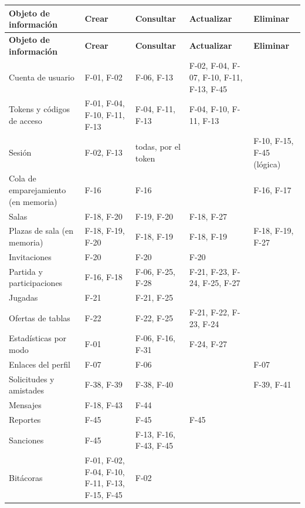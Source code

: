 \begin{center}\small
\begin{longtable}{|L{0.21\textwidth}|L{0.18\textwidth}|L{0.13\textwidth}|L{0.21\textwidth}|L{0.13\textwidth}|}
\hline
\textbf{Objeto de información} & \textbf{Crear} & \textbf{Consultar} & \textbf{Actualizar} & \textbf{Eliminar} \\ \hline
\endfirsthead
\hline
\textbf{Objeto de información} & \textbf{Crear} & \textbf{Consultar} & \textbf{Actualizar} & \textbf{Eliminar} \\ \hline
\endhead
Cuenta de usuario & \mbox{F-01}, \mbox{F-02} & \mbox{F-06}, \mbox{F-13} & \mbox{F-02}, \mbox{F-04}, \mbox{F-07}, \mbox{F-10}, \mbox{F-11}, \mbox{F-13}, \mbox{F-45} &  \\ \hline
Tokens y códigos de acceso & \mbox{F-01}, \mbox{F-04}, \mbox{F-10}, \mbox{F-11}, \mbox{F-13} & \mbox{F-04}, \mbox{F-11}, \mbox{F-13} & \mbox{F-04}, \mbox{F-10}, \mbox{F-11}, \mbox{F-13} &  \\ \hline
Sesión & \mbox{F-02}, \mbox{F-13} & todas, por el token &  & \mbox{F-10}, \mbox{F-15}, \mbox{F-45} (lógica) \\ \hline
Cola de emparejamiento (en memoria) & \mbox{F-16} & \mbox{F-16} &  & \mbox{F-16}, \mbox{F-17} \\ \hline
Salas & \mbox{F-18}, \mbox{F-20} & \mbox{F-19}, \mbox{F-20} & \mbox{F-18}, \mbox{F-27} &  \\ \hline
Plazas de sala (en memoria) & \mbox{F-18}, \mbox{F-19}, \mbox{F-20} & \mbox{F-18}, \mbox{F-19} & \mbox{F-18}, \mbox{F-19} & \mbox{F-18}, \mbox{F-19}, \mbox{F-27} \\ \hline
Invitaciones & \mbox{F-20} & \mbox{F-20} & \mbox{F-20} &  \\ \hline
Partida y participaciones & \mbox{F-16}, \mbox{F-18} & \mbox{F-06}, \mbox{F-25}, \mbox{F-28} & \mbox{F-21}, \mbox{F-23}, \mbox{F-24}, \mbox{F-25}, \mbox{F-27} &  \\ \hline
Jugadas & \mbox{F-21} & \mbox{F-21}, \mbox{F-25} &  &  \\ \hline
Ofertas de tablas & \mbox{F-22} & \mbox{F-22}, \mbox{F-25} & \mbox{F-21}, \mbox{F-22}, \mbox{F-23}, \mbox{F-24} &  \\ \hline
Estadísticas por modo & \mbox{F-01} & \mbox{F-06}, \mbox{F-16}, \mbox{F-31} & \mbox{F-24}, \mbox{F-27} &  \\ \hline
Enlaces del perfil & \mbox{F-07} & \mbox{F-06} &  & \mbox{F-07} \\ \hline
Solicitudes y amistades & \mbox{F-38}, \mbox{F-39} & \mbox{F-38}, \mbox{F-40} &  & \mbox{F-39}, \mbox{F-41} \\ \hline
Mensajes & \mbox{F-18}, \mbox{F-43} & \mbox{F-44} &  &  \\ \hline
Reportes & \mbox{F-45} & \mbox{F-45} & \mbox{F-45} &  \\ \hline
Sanciones & \mbox{F-45} & \mbox{F-13}, \mbox{F-16}, \mbox{F-43}, \mbox{F-45} &  &  \\ \hline
Bitácoras & \mbox{F-01}, \mbox{F-02}, \mbox{F-04}, \mbox{F-10}, \mbox{F-11}, \mbox{F-13}, \mbox{F-15}, \mbox{F-45} & \mbox{F-02} &  &  \\ \hline
\end{longtable}
\end{center}

